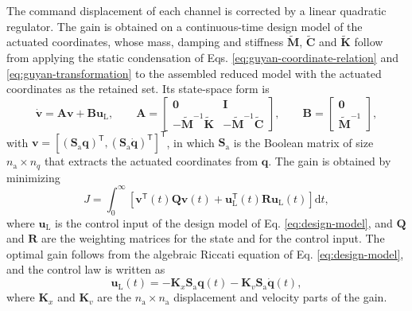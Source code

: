 \documentclass[11pt,a4paper]{article}
\numberwithin{equation}{section}
\begin{document}
The command displacement of each channel is corrected by a linear quadratic regulator. The gain is obtained on a continuous-time design model of the actuated coordinates, whose mass, damping and stiffness \(\widetilde{\mathbf{M}}\), \(\widetilde{\mathbf{C}}\) and \(\widetilde{\mathbf{K}}\) follow from applying the static condensation of Eqs. \eqref{eq:guyan-coordinate-relation} and \eqref{eq:guyan-transformation} to the assembled reduced model with the actuated coordinates as the retained set. Its state-space form is
\begin{equation}
	\dot{\bm{v}}=\mathbf{A}\bm{v}+\mathbf{B}\bm{u}_{\mathrm{L}},
		\qquad
		\mathbf{A}=
		\begin{bmatrix}
			\mathbf{0} & \mathbf{I}\\
			-\widetilde{\mathbf{M}}^{-1}\widetilde{\mathbf{K}}
			& -\widetilde{\mathbf{M}}^{-1}\widetilde{\mathbf{C}}
		\end{bmatrix},
		\qquad
		\mathbf{B}=
		\begin{bmatrix}
			\mathbf{0}\\
			\widetilde{\mathbf{M}}^{-1}
		\end{bmatrix},
	\label{eq:design-model}
\end{equation}
with \(\bm{v}=[(\mathbf{S}_{\mathrm{a}}\bm{q})^{\mathsf{T}},(\mathbf{S}_{\mathrm{a}}\dot{\bm{q}})^{\mathsf{T}}]^{\mathsf{T}}\), in which \(\mathbf{S}_{\mathrm{a}}\) is the Boolean matrix of size \(n_{\mathrm{a}}\times n_{q}\) that extracts the actuated coordinates from \(\bm{q}\). The gain is obtained by minimizing
\begin{equation}
	J=\int_{0}^{\infty}
	\left[
	\bm{v}^{\mathsf{T}}(t)\mathbf{Q}\bm{v}(t)
	+\bm{u}_{\mathrm{L}}^{\mathsf{T}}(t)\mathbf{R}\bm{u}_{\mathrm{L}}(t)
	\right]\mathrm{d}t,
	\label{eq:lqr-cost}
\end{equation}
where \(\bm{u}_{\mathrm{L}}\) is the control input of the design model of Eq. \eqref{eq:design-model}, and \(\mathbf{Q}\) and \(\mathbf{R}\) are the weighting matrices for the state and for the control input. The optimal gain follows from the algebraic Riccati equation of Eq. \eqref{eq:design-model}, and the control law is written as
\begin{equation}
	\bm{u}_{\mathrm{L}}(t)=
	-\mathbf{K}_{x}\mathbf{S}_{\mathrm{a}}\bm{q}(t)
	-\mathbf{K}_{v}\mathbf{S}_{\mathrm{a}}\dot{\bm{q}}(t),
	\label{eq:lqr-law}
\end{equation}
where \(\mathbf{K}_{x}\) and \(\mathbf{K}_{v}\) are the \(n_{\mathrm{a}}\times n_{\mathrm{a}}\) displacement and velocity parts of the gain.
\end{document}
